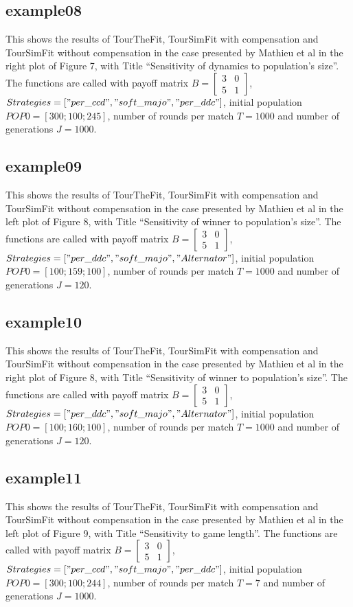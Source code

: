 \subsection{example08}
This shows the results of TourTheFit, TourSimFit with compensation and TourSimFit without compensation in the case presented by Mathieu et al in the right plot of Figure 7, with Title ``Sensitivity of dynamics to population's size''. The functions are called with payoff matrix $B = \begin{bmatrix} 3 & 0 \\ 5 & 1 \end{bmatrix}$, $Strategies = ["per\_ccd", "soft\_majo", "per\_ddc"]$, initial population $POP0 = [300; 100; 245]$, number of rounds per match $T = 1000$ and number of generations $J = 1000$.

\subsection{example09}
This shows the results of TourTheFit, TourSimFit with compensation and TourSimFit without compensation in the case presented by Mathieu et al in the left plot of Figure 8, with Title ``Sensitivity of winner to population's size''. The functions are called with payoff matrix $B = \begin{bmatrix} 3 & 0 \\ 5 & 1 \end{bmatrix}$, $Strategies = ["per\_ddc", \- "soft\_majo", \-"Alternator"]$, initial population $POP0 = [100; 159; 100]$, number of rounds per match $T = 1000$ and number of generations $J = 120$.

\subsection{example10}
This shows the results of TourTheFit, TourSimFit with compensation and TourSimFit without compensation in the case presented by Mathieu et al in the right plot of Figure 8, with Title ``Sensitivity of winner to population's size''. The functions are called with payoff matrix $B = \begin{bmatrix} 3 & 0 \\ 5 & 1 \end{bmatrix}$, $Strategies = ["per\_ddc", "soft\_majo", "Alternator"]$, initial population $POP0 = [100; 160; 100]$, number of rounds per match $T = 1000$ and number of generations $J = 120$.

\subsection{example11}
This shows the results of TourTheFit, TourSimFit with compensation and TourSimFit without compensation in the case presented by Mathieu et al in the left plot of Figure 9, with Title ``Sensitivity to game length''. The functions are called with payoff matrix $B = \begin{bmatrix} 3 & 0 \\ 5 & 1 \end{bmatrix}$, $Strategies = ["per\_ccd", "soft\_majo", "per\_ddc"]$, initial population $POP0 = [300; 100; 244]$, number of rounds per match $T = 7$ and number of generations $J = 1000$.

